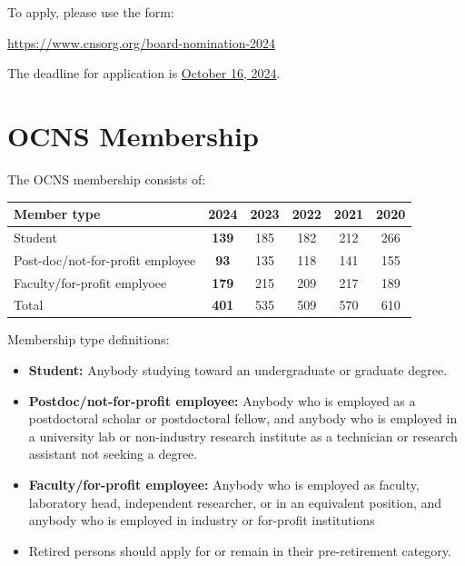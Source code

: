 \documentclass[11pt,a4paper,oneside]{article}
\begin{document}
To apply, please use the form:

\begin{center}
\url{https://www.cnsorg.org/board-nomination-2024}
\end{center}

The deadline for application is \underline{October 16, 2024}.

\clearpage
\section*{OCNS Membership}%
\sectionauthor{\vspace{-4ex}}

The OCNS membership consists of:
\begin{table}[!h]
  \centering
  \begin{tabularx}{0.7\textwidth}{X|ccccc}
    \textbf{Member type}& \textbf{2024} & \textbf{2023} & \textbf{2022} & \textbf{2021} & \textbf{2020} \\
    \toprule{}
    Student & \textbf{139} &  185 & 182 & 212 & 266 \\
    Post-doc/not-for-profit employee & \textbf{93} & 135 & 118 & 141 & 155 \\
    Faculty/for-profit emplyoee & \textbf{179} & 215 & 209 & 217 & 189 \\
    \midrule{}
    Total & \textbf{401} & 535 & 509 & 570 & 610 \\
  \end{tabularx}
\end{table}

Membership type definitions:
\begin{itemize}
  \item \textbf{Student:} Anybody studying toward an undergraduate or graduate degree.
  \item \textbf{Postdoc/not-for-profit employee:} Anybody who is employed as a postdoctoral scholar or postdoctoral fellow, and anybody who is employed in a university lab or non-industry research institute as a technician or research assistant not seeking a degree.
  \item \textbf{Faculty/for-profit employee:} Anybody who is employed as faculty, laboratory head, independent researcher, or in an equivalent position, and anybody who is employed in industry or for-profit institutions
  \item Retired persons should apply for or remain in their pre-retirement category.
\end{itemize}
\end{document}
